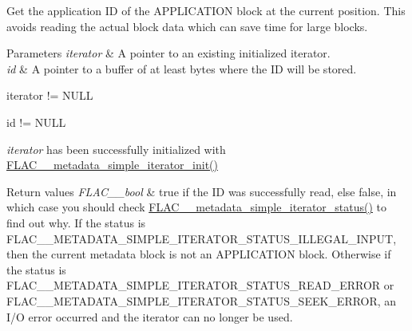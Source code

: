 Get the application ID of the {\ttfamily A\+P\+P\+L\+I\+C\+A\+T\+I\+ON} block at the current position. This avoids reading the actual block data which can save time for large blocks.


\begin{DoxyParams}{Parameters}
{\em iterator} & A pointer to an existing initialized iterator. \\
\hline
{\em id} & A pointer to a buffer of at least {} bytes where the ID will be stored.  
\begin{DoxyCode}
iterator != NULL 
\end{DoxyCode}
 
\begin{DoxyCode}
\textcolor{keywordtype}{id} != NULL 
\end{DoxyCode}
 {\itshape iterator} has been successfully initialized with \hyperlink{group__flac__metadata__level1_ga2a055cca4e6e06ae62517c8b0fa6e8a3}{F\+L\+A\+C\+\_\+\+\_\+metadata\+\_\+simple\+\_\+iterator\+\_\+init()} \\
\hline
\end{DoxyParams}

\begin{DoxyRetVals}{Return values}
{\em F\+L\+A\+C\+\_\+\+\_\+bool} & {\ttfamily true} if the ID was successfully read, else {\ttfamily false}, in which case you should check \hyperlink{group__flac__metadata__level1_ga68cfafa2323154f3ee1d3061eafe109f}{F\+L\+A\+C\+\_\+\+\_\+metadata\+\_\+simple\+\_\+iterator\+\_\+status()} to find out why. If the status is {\ttfamily F\+L\+A\+C\+\_\+\+\_\+\+M\+E\+T\+A\+D\+A\+T\+A\+\_\+\+S\+I\+M\+P\+L\+E\+\_\+\+I\+T\+E\+R\+A\+T\+O\+R\+\_\+\+S\+T\+A\+T\+U\+S\+\_\+\+I\+L\+L\+E\+G\+A\+L\+\_\+\+I\+N\+P\+UT}, then the current metadata block is not an {\ttfamily A\+P\+P\+L\+I\+C\+A\+T\+I\+ON} block. Otherwise if the status is {\ttfamily F\+L\+A\+C\+\_\+\+\_\+\+M\+E\+T\+A\+D\+A\+T\+A\+\_\+\+S\+I\+M\+P\+L\+E\+\_\+\+I\+T\+E\+R\+A\+T\+O\+R\+\_\+\+S\+T\+A\+T\+U\+S\+\_\+\+R\+E\+A\+D\+\_\+\+E\+R\+R\+OR} or {\ttfamily F\+L\+A\+C\+\_\+\+\_\+\+M\+E\+T\+A\+D\+A\+T\+A\+\_\+\+S\+I\+M\+P\+L\+E\+\_\+\+I\+T\+E\+R\+A\+T\+O\+R\+\_\+\+S\+T\+A\+T\+U\+S\+\_\+\+S\+E\+E\+K\+\_\+\+E\+R\+R\+OR}, an I/O error occurred and the iterator can no longer be used. \\
\hline
\end{DoxyRetVals}
\mbox{\label{group__flac__metadata__level1_ga31c9e013b3bdc04866eee2271349fe60}} 
